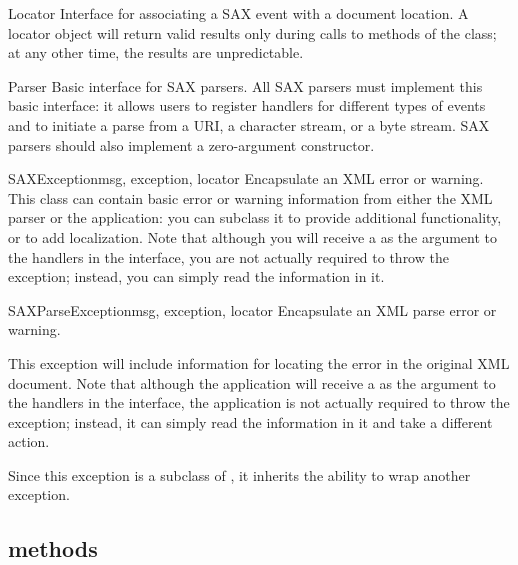 \documentclass{howto}
\begin{document}
\begin{classdesc}{Locator}{}
Interface for associating a SAX event with a document
location. A locator object will return valid results only during
calls to methods of the  class; 
at any other time, the results are unpredictable.
\end{classdesc}

\begin{classdesc}{Parser}{}
Basic interface for SAX parsers. All SAX
    parsers must implement this basic interface: it allows users to
    register handlers for different types of events and to initiate a
    parse from a URI, a character stream, or a byte stream. SAX
    parsers should also implement a zero-argument constructor.
\end{classdesc}


\begin{classdesc}{SAXException}{msg, exception, locator}
Encapsulate an XML error or warning. This class can contain
    basic error or warning information from either the XML parser or
    the application: you can subclass it to provide additional
    functionality, or to add localization. Note that although you will
    receive a  as the argument to the handlers in the
     interface, you are not actually required to throw
    the exception; instead, you can simply read the information in
    it.
\end{classdesc}

\begin{classdesc}{SAXParseException}{msg, exception, locator}
Encapsulate an XML parse error or warning.
    
This exception will include information for locating the error in the
    original XML document. Note that although the application will
    receive a  as the argument to the
    handlers in the  interface, the application is not
    actually required to throw the exception; instead, it can simply
    read the information in it and take a different action.

Since this exception is a subclass of , it inherits
    the ability to wrap another exception.
\end{classdesc}


\subsection{ methods}
\end{document}
